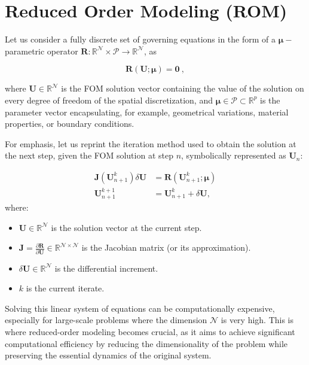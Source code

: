 \section{Reduced Order Modeling (ROM)}

Let us consider a fully discrete set of governing equations in the form of a $\boldsymbol{\mu}-$parametric operator $\mathbf{R}:\mathbb{R}^{\mathcal{N}} \times \mathcal{P} \rightarrow \mathbb{R}^\mathcal{N}$, as

\begin{equation}
\mathbf{R}(\mathbf{U}; \boldsymbol{\mu}) = \boldsymbol{0} \ ,
\label{eq: residual discrete}
\end{equation}

\noindent where $\mathbf{U} \in \mathbb{R}^{\mathcal{N}}$ is the FOM solution vector containing the value of the solution on every degree of freedom of the spatial discretization, and $\boldsymbol{\mu} \in \mathcal{P} \subset \mathbb{R}^p$ is the parameter vector encapsulating, for example, geometrical variations, material properties, or boundary conditions.

For emphasis, let us reprint the iteration method used to obtain the solution at the next step, given the FOM solution at step $n$, symbolically represented as $\mathbf{U}_n$:

\begin{subequations}
\begin{align}
\mathbf{J}(\mathbf{U}_{n+1}^k) \delta \mathbf{U} & = \mathbf{R} (\mathbf{U}_{n+1}^{k}; \boldsymbol{\mu})\\
\mathbf{U}_{n+1}^{k+1} &= \mathbf{U}_{n+1}^{k} + \delta\mathbf{U},
\end{align}
\end{subequations}
\noindent where:
\begin{itemize}
\item $\mathbf{U} \in \mathbb{R}^{\mathcal{N}}$ is the solution vector at the current step.
\item $\mathbf{J} = \frac{\partial \mathbf{R}}{\partial \mathbf{U}} \in \mathbb{R}^{\mathcal{N} \times \mathcal{N}}$ is the Jacobian matrix (or its approximation).
\item $\delta \mathbf{U} \in \mathbb{R}^{\mathcal{N}}$ is the differential increment.
\item $k$ is the current iterate.
\end{itemize}

Solving this linear system of equations can be computationally expensive, especially for large-scale problems where the dimension \(\mathcal{N}\) is very high. This is where reduced-order modeling becomes crucial, as it aims to achieve significant computational efficiency by reducing the dimensionality of the problem while preserving the essential dynamics of the original system.

